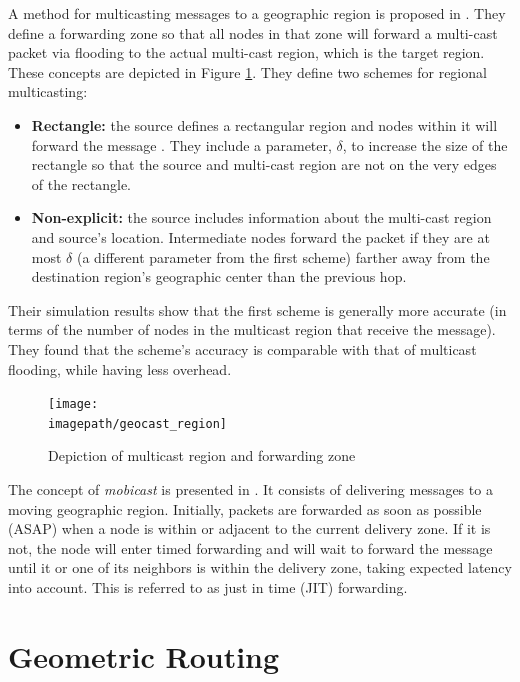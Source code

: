 \documentclass[conference]{IEEEtran}
\newcommand{\imagepath}{../../images/external/location_routing}
\begin{document}
A method for multicasting messages to a geographic region is proposed in \cite{749282}.
They define a forwarding zone so that all nodes in that zone will forward a multi-cast packet via flooding to the actual multi-cast region, which is the target region.
These concepts are depicted in Figure \ref{fig:multicast-region}.
They define two schemes for regional multicasting:
\begin{itemize}
\item \textbf{Rectangle:} the source defines a rectangular region and nodes within it will forward the message .
They include a parameter, $\delta$, to increase the size of the rectangle so that the source and multi-cast region are not on the very edges of the rectangle.          
\item \textbf{Non-explicit:} the source includes information about the multi-cast region and source's location.
Intermediate nodes forward the packet if they are at most $\delta$ (a different parameter from the first scheme) farther away from the destination region's geographic center than the previous hop.
\end{itemize}
Their simulation results show that the first scheme is generally more accurate (in terms of the number of nodes in the multicast region that receive the message).
They found that the scheme's accuracy is comparable with that of multicast flooding, while having less overhead.

\begin{figure}
\label{fig:multicast-region}
\centering
\texttt{[image: \\imagepath/geocast\_region]}
\caption{Depiction of multicast region and forwarding zone}
\end{figure}

The concept of \emph{mobicast} is presented in \cite{Huang2005}.
It consists of delivering messages to a moving geographic region.
Initially, packets are forwarded as soon as possible (ASAP) when a node is within or adjacent to the current delivery zone.
If it is not, the node will enter timed forwarding and will wait to forward the message until it or one of its neighbors is within the delivery zone, taking expected latency into account.
This is referred to as just in time (JIT) forwarding.



\section{Geometric Routing}
\end{document}
